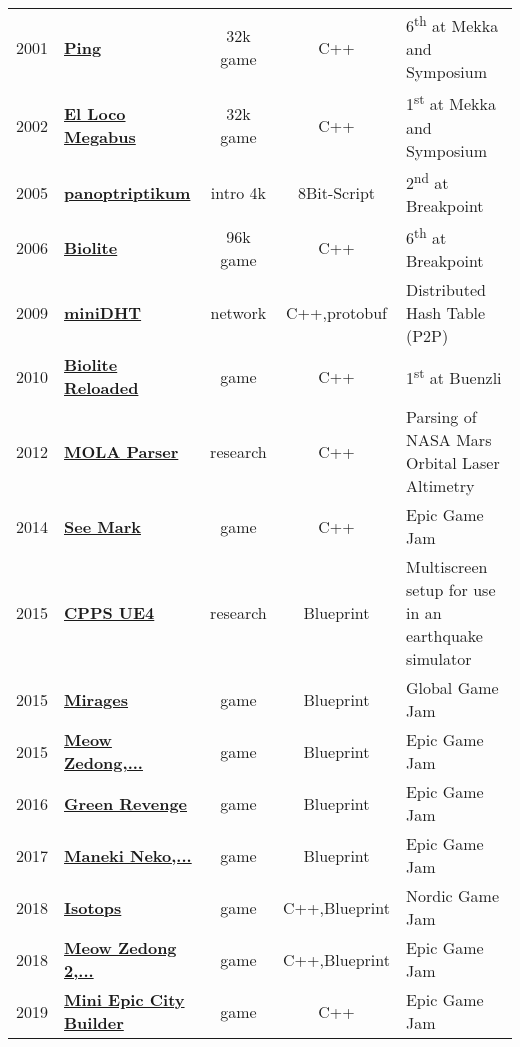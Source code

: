 \documentclass[a4paper]{deedy-resume} %
\begin{document}
\begin{tabular}{rlccl}
2001 & \textbf{\href{http://www.pouet.net/prod.php?which=5691}{Ping}} &
    32k game & C++ & 6\textsuperscript{th} at Mekka and Symposium \\
2002 & \textbf{\href{http://www.pouet.net/prod.php?which=5652}{El Loco Megabus}} &
    32k game & C++ & 1\textsuperscript{st} at Mekka and Symposium \\
2005 & \textbf{\href{http://www.pouet.net/prod.php?which=16393}{panoptriptikum}} &
    intro 4k & 8Bit-Script & 2\textsuperscript{nd} at Breakpoint \\
2006 & \textbf{\href{http://www.pouet.net/prod.php?which=24578}{Biolite}} &
    96k game & C++ & 6\textsuperscript{th} at Breakpoint \\
2009 & \textbf{\href{https://github.com/anirul/miniDHT}{miniDHT}} &
    network & C++,protobuf & Distributed Hash Table (P2P) \\
2010 & \textbf{\href{http://www.pouet.net/prod.php?which=55711}{Biolite Reloaded}} &
    game & C++ & 1\textsuperscript{st} at Buenzli \\
2012 & \textbf{\href{https://github.com/anirul/MOLA_parser}{MOLA Parser}} &
    research & C++ & Parsing of NASA Mars Orbital Laser Altimetry \\
2014 & \textbf{\href{https://www.epicgamejam.com/games/sea-mark}{See Mark}} &
    game & C++ & Epic Game Jam \\
2015 & \textbf{\href{https://github.com/anirul/CppsTest}{CPPS UE4}} &
    research & Blueprint & Multiscreen setup for use in an earthquake simulator \\
2015 & \textbf{\href{https://globalgamejam.org/2015/games/mirages}{Mirages}} &
    game & Blueprint & Global Game Jam \\
2015 & \textbf{\href{https://www.epicgamejam.com/games/meow-zedong-great-helmsman-future-chairman-urinal-leap-forward}{Meow Zedong,...}} &
    game & Blueprint & Epic Game Jam \\
2016 & \textbf{\href{https://www.epicgamejam.com/games/greens-revenge}{Green Revenge}} &
    game & Blueprint & Epic Game Jam \\
2017 & \textbf{\href{https://www.epicgamejam.com/games/meow-zedongs-battle-royale-maneki-neko-wool-party-ocean-deathmatch}{Maneki Neko,...}} &
    game & Blueprint & Epic Game Jam \\
2018 & \textbf{\href{https://anirul.itch.io/isotops}{Isotops}} &
    game & C++,Blueprint & Nordic Game Jam \\
2018 & \textbf{\href{https://www.epicgamejam.com/games/meow-zedong-great-helmsman-future-chairman-urinal-leap-forward}{Meow Zedong 2,...}} &
    game & C++,Blueprint & Epic Game Jam \\
2019 & \textbf{\href{https://www.epicgamejam.com/games/mini-epic-city-builder}{Mini Epic City Builder}} &
    game & C++ & Epic Game Jam \\
\end{tabular}
\end{document}
